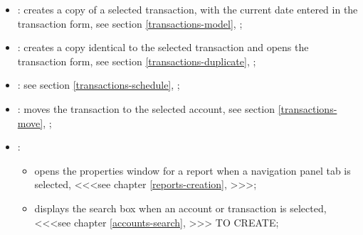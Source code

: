 \begin{itemize}
	\item {}: creates a copy of a selected transaction, with the current date entered in the transaction form, see section \vref{transactions-model}, ;
	\item {}: creates a copy identical to the selected transaction and opens the transaction form, see section \vref{transactions-duplicate}, ;
	\item {}: see section \vref{transactions-schedule}, ;
	\item {}: moves the transaction to the selected account, see section \vref{transactions-move}, ;
	\item {}:
	\begin{itemize}
		\item opens the properties window for a report when a navigation panel tab is selected, <<<see chapter \vref{reports-creation}, >>>;%
		\item displays the search box when an account or transaction is selected, <<<see chapter \vref{accounts-search}, >>> TO CREATE; %

\end{itemize}
\end{itemize}
